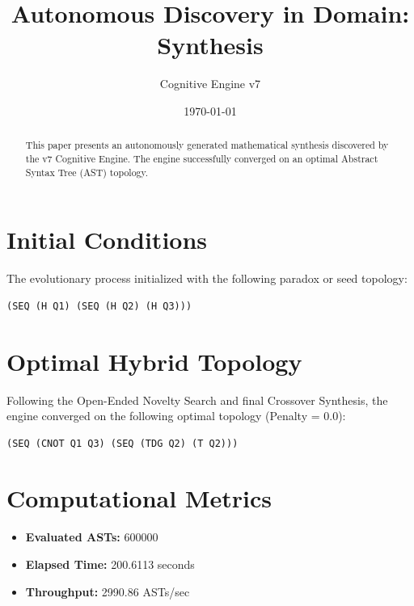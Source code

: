 \documentclass{article}
\title{Autonomous Discovery in Domain: Synthesis}
\author{Cognitive Engine v7}
\date{\today}
\begin{document}
\maketitle
\begin{abstract}
This paper presents an autonomously generated mathematical synthesis discovered by the v7 Cognitive Engine. The engine successfully converged on an optimal Abstract Syntax Tree (AST) topology.\end{abstract}
\section{Initial Conditions}
The evolutionary process initialized with the following paradox or seed topology:
\begin{verbatim}
(SEQ (H Q1) (SEQ (H Q2) (H Q3)))
\end{verbatim}
\section{Optimal Hybrid Topology}
Following the Open-Ended Novelty Search and final Crossover Synthesis, the engine converged on the following optimal topology (Penalty = 0.0):
\begin{verbatim}
(SEQ (CNOT Q1 Q3) (SEQ (TDG Q2) (T Q2)))
\end{verbatim}
\section{Computational Metrics}
\begin{itemize}
  \item \textbf{Evaluated ASTs:} 600000
  \item \textbf{Elapsed Time:} 200.6113 seconds
  \item \textbf{Throughput:} 2990.86 ASTs/sec
\end{itemize}
\end{document}
